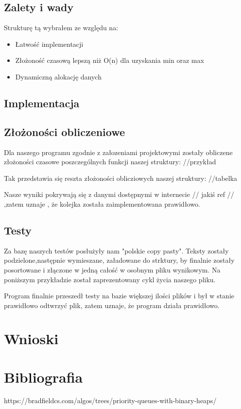 \documentclass{article}
\begin{document}
\subsection{Zalety i wady}
Strukturę tą wybrałem ze względu na:
\begin{itemize}
    \item Łatwość implementacji
    \item Złożoność czasową lepszą niż O(n) dla uzyskania min oraz max
    \item Dynamiczną alokację danych
\end{itemize}


\subsection{Implementacja}
\subsection{Złożoności obliczeniowe}
Dla naszego programu zgodnie z załozeniami projektowymi zostały obliczene złożoności czasowe poszczególnych 
funkcji naszej struktury:
//przykład

Tak przedstawia się reszta złożoności oblicziowych naszej struktury:
//tabelka

Nasze wyniki pokrywają się z danymi dostępnymi w internecie // jakiś ref // ,zatem uznaje , że kolejka
została zaimplementowana prawidłowo.


\subsection{Testy}
Za bazę naszych testów posłużyły nam "polskie copy pasty". Teksty zostały podzielone,następnie wymieszane, załadowane do strktury,
by finalnie zostały posortowane i złączone w jedną całość w osobnym pliku wynikowym. Na poniższym przykładzie
został zaprezentowany cykl życia naszego pliku.



Program finalnie przeszedł testy na bazie większej ilości plików i był w stanie prawidłowo odtwrzyć plik, zatem
uznaje, że program działa prawidłowo.

\section{Wnioski}
\section{Bibliografia}
https://bradfieldcs.com/algos/trees/priority-queues-with-binary-heaps/
\end{document}

